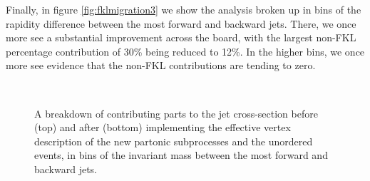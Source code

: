 Finally, in figure \ref{fig:fklmigration3} we show the analysis broken up in bins of the rapidity difference between the most forward and backward jets. There, we once more see a substantial improvement across the board, with the largest non-FKL percentage contribution of 30\% being reduced to 12\%. In the higher bins, we once more see evidence that the non-FKL contributions are tending to zero. 

\begin{figure}[H] 
\centering
{} \\
\caption{A breakdown of contributing parts to the jet cross-section before (top) and after (bottom) implementing the effective vertex description of the new partonic subprocesses and the unordered events, in bins of the invariant mass between the most forward and backward jets.}
\label{fig:fklmigration}
\end{figure}

